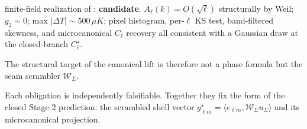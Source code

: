\begin{remark}
\begin{enumerate}[label=(O\arabic*),leftmargin=2.4em,topsep=3pt,itemsep=2pt]
\begin{enumerate}[label=(\alph*),leftmargin=2em,topsep=2pt,itemsep=1pt]
finite-field realization of : \textbf{candidate}.
$A_\ell(k)=O(\sqrt{\ell})$ structurally by Weil; $g_2\sim 0$; max $|\Delta T|\sim 500\,\mu K$;
pixel histogram, per-$\ell$ KS test, band-filtered skewness, and microcanonical $C_\ell$ recovery
all consistent with a Gaussian draw at the closed-branch $C_\ell^\star$.
\end{enumerate}
The structural target of the canonical lift is therefore not a phase formula but the seam
scrambler $\mathcal W_\Sigma$.
\end{enumerate}
Each obligation is independently falsifiable. Together they fix the form of the closed Stage 2
prediction: the scrambled shell vector
\(g_{\ell m}^{\star}=\langle e_{\ell m},\mathcal W_\Sigma u_\Sigma\rangle\)
and its microcanonical projection.
\end{remark}


